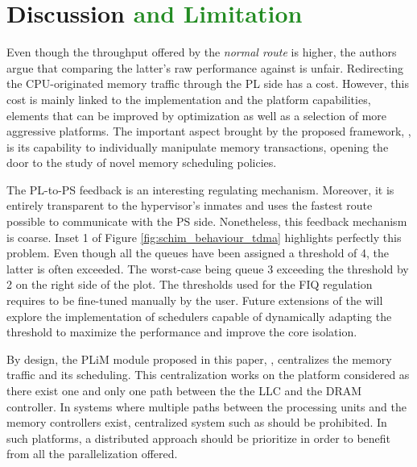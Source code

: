 \section{Discussion \textcolor{ForestGreen}{and Limitation}}
\label{sec:discussion}
\color{red}
Even though the throughput offered by the \emph{normal route} is higher, the
authors argue that comparing the latter's raw performance against \schim is unfair.
Redirecting the CPU-originated memory traffic through the PL side has a cost.
However, this cost is mainly linked to the implementation and the platform capabilities, elements that can be improved by optimization as well as a selection of more aggressive platforms.
The important aspect brought by the proposed framework, \schim, is its capability to individually manipulate memory transactions, opening the door to the study of novel memory scheduling policies.

The PL-to-PS feedback is an interesting regulating mechanism. Moreover, it is entirely transparent to the hypervisor's inmates and uses the fastest route possible to communicate with the PS side. Nonetheless, this feedback mechanism is coarse. Inset 1 of Figure \ref{fig:schim_behaviour_tdma} highlights perfectly this problem. Even though all the queues have been assigned a threshold of 4, the latter is often exceeded. The worst-case being queue 3 exceeding the threshold by 2 on the right side of the plot.
The thresholds used for the FIQ regulation requires to be fine-tuned manually by the user. Future extensions of the \schim will explore the implementation of schedulers capable of dynamically adapting the threshold to maximize the performance and improve the core isolation.

\color{ForestGreen}

By design, the PLiM module proposed in this paper, \schim, centralizes the
memory traffic and its scheduling. This centralization works on the platform
considered as there exist one and only one path between the the LLC and the
DRAM controller. In systems where multiple paths between the processing units
and the memory controllers exist, centralized system such as \schim should be
prohibited. In such platforms, a distributed approach should be prioritize in
order to benefit from all the parallelization offered.

